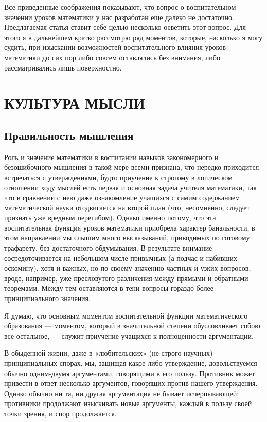 \documentclass[12pt, a4paper, openany]{book}
\begin{document}
Все приведенные соображения показывают, что вопрос о воспитательном значении уроков математики у нас  разработан еще далеко не достаточно. Предлагаемая статья ставит себе целью несколько осветить этот вопрос. Для этого я в дальнейшем кратко рассмотрю ряд моментов, которые, насколько я могу судить, при изыскании  возможностей воспитательного влияния уроков математики до сих пор либо совсем оставлялись без внимания, либо  рассматривались лишь поверхностно. 

\section*{\textbf{КУЛЬТУРА МЫСЛИ}}

\subsection*{\textbf{Правильность мышления}}

Роль и значение математики в воспитании навыков  закономерного и безошибочного мышления в такой мере всеми признана, что нередко приходится встречаться с утверждениями, будто приучение к строгому в логическом отношении ходу мыслей есть первая и основная задача учителя математики, так что в сравнении с нею даже  ознакомление учащихся с самим содержанием математической науки отодвигается на второй план (что, несомненно,  следует признать уже вредным перегибом). Однако именно потому, что эта воспитательная функция уроков математики приобрела характер банальности, в этом направлении мы слышим много высказываний, приводимых по готовому трафарету, без достаточного обдумывания. В результате внимание сосредоточивается на небольшом числе  привычных (а подчас и набивших оскомину), хотя и важных, но по своему значению частных и узких вопросов, вроде,  например, уже пресловутого различения между прямыми и обратными теоремами. Между тем оставляются в тени вопросы гораздо более принципиального значения. 

Я думаю, что основным моментом воспитательной  функции математического образования — моментом, который в значительной степени обусловливает собою все остальное, — служит приучение учащихся к полноценности  
аргументации. 

В обыденной жизни, даже в «любительских» (не строго научных) принципиальных спорах, мы, защищая какое-либо утверждение, довольствуемся обычно одним-двумя аргументами, говорящими в его пользу. Противник может привести в ответ несколько аргументов, говорящих против нашего утверждения. Однако обычно ни та, ни другая аргументация не бывает исчерпывающей; противники  продолжают изыскивать новые аргументы, каждый в пользу своей точки зрения, и спор продолжается. 
\end{document}
